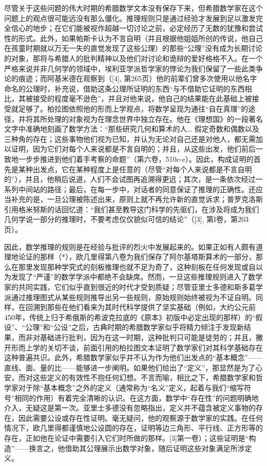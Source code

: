 尽管关于这些问题的伟大时期的希腊数学文本没有保存下来，但希腊数学家在这个问题上的观点很可能远没有那么僵化。推理规则只是通过经验才发展到足以激发完全信心的地步；在它们能被视作超越一切讨论之前，必定经历了无数的犹豫和尝试性的形式。此外，如果帕斯卡认为不言自明（并且根据他姐姐所创的传说，他自己在孩童时期就以万无一失的直觉发现了这些公理）的那些“公理”没有成为长期讨论的对象，那将与希腊人的批判精神以及他们对讨论和诡辩的爱好格格不入。在一个严格来说并非几何学的领域中，埃利亚学派哲学家的悖论为我们保留了一些此类争论的痕迹；而阿基米德在观察到（{[}4{]}, 第265页）他的前辈们曾多次使用以他名字命名的公理时，补充说，借助这条公理所证明的东西“与不借助它证明的东西相比，其被接受的程度毫不逊色”，并且对他来说，他自己的结果能在此基础上被接受就足够了。柏拉图依照他的形而上学观点，将数学呈现为通往“自在真理”的途径，并将其所处理的对象视为在理念世界中独立存在。他在《理想国》的一段著名文字中准确地刻画了数学方法：“那些研究几何和算术的人\ldots{} 假定奇数和偶数以及三种角的存在；这些事物他们视为已知，并认为无论对自己还是对他人，都无需加以证明，因为它们对每个人来说都是不言自明的；并且，从这些出发，他们前后一致地一步步推进到他们着手考察的命题”（第六卷，510c-e）。因此，构成证明的首先是某种出发点，它在某种程度上是任意的（尽管“对每个人来说都是不言自明的”），并且，他稍后说道，人们不会试图再追溯得更远；其次，是一条依次经过一系列中间站的路径；最后，在每一步中，对话者的同意保证了推理的正确性。还应当补充的是，一旦公理被陈述出来，原则上就不再允许新的直觉诉求；普罗克洛斯引用格米努斯的话回忆道：“我们甚至教导这门科学的先驱们，在涉及将成为我们几何学说一部分的推理时，不要考虑仅仅貌似可信的结论”（{[}3{]}, 第I卷，第203页）。

因此，数学推理的规则是在经验与批评的烈火中发展起来的。如果正如有人颇有道理地论证的那样（*），欧几里得第八卷为我们保存了阿尔基塔斯算术的一部分，那么在那里发现那种学究式的刻板推理也就不足为奇了，这种刻板在任何发现或自以为发现了“严谨”的数学学派中都绝不会缺席。然而，一旦这些推理规则进入了数学家的共同实践，它们似乎直到很近的时代才受到质疑；尽管亚里士多德和斯多葛学派通过推理图式从某些规则推导出另一些规则，原始规则始终被视为不证自明。同样，在回溯到那些在他们看来为其时代科学提供了坚实基础（例如，大约公元前450年，传统上归于希俄斯的希波克拉底的《原本》初版中必定出现的那样）的“假设”、“公理”和“公设”之后，古典时期的希腊数学家似乎将精力倾注于发现新结果，而非对基础进行批判，因为在这一时期，这种批判只可能是徒劳的；并且，撇开形而上学的关切不谈，前面引用的柏拉图文本证明了数学家们对其科学基础存在这种普遍共识。此外，希腊数学家似乎并不认为作为他们出发点的“基本概念”——直线、面、量的比——能够进一步阐明。如果他们给出了“定义”，那显然是为了心安，而对这些定义的有效性不抱任何幻想。不言而喻，相比之下，希腊数学家和哲学家对于除“基本概念”之外的定义（通常称为“名义”定义，起着与我们“缩写符号”相同的作用）有着完全清晰的认识。在这方面，数学中“存在性”的问题明确地介入，无疑这是第一次。亚里士多德没有忽略指出，定义并不蕴含被定义事物的存在，因此需要公设或存在性证明。毫无疑问，他的观察源于数学家的实践。在任何情况下，欧几里得都谨慎地公设圆的存在，证明等边三角形、平行线、正方形等的存在，正如他在论证中需要引入它们时所做的那样。{[}3{]}第一卷）；这些证明是“构造”——换言之，他借助其公理展示出数学对象，随后证明这些对象满足所涉定义。

